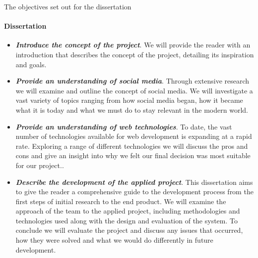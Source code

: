 The objectives set out for the dissertation 
\paragraph{Dissertation}
\begin{itemize}
\item \textit{\textbf{Introduce the concept of the project}}. We will provide the reader with an introduction that describes the concept of the project, detailing its inspiration and goals.
\item \textit{\textbf{Provide an understanding of social media}}. Through extensive research we will examine and outline the concept of social media. We will investigate a vast variety of topics ranging from how social media began, how it became what it is today and what we must do to stay relevant in the modern world.
\item \textit{\textbf{Provide an understanding of web technologies}}. To date, the vast number of technologies available for web development is expanding at a rapid rate. Exploring a range of different technologies we will discuss the pros and cons and give an insight into why we felt our final decision was most suitable for our project..
\item \textit{\textbf{Describe the development of the applied project}}. This dissertation aims to give the reader a comprehensive guide to the development process from the first steps of initial research to the end product. We will examine the approach of the team to the applied project, including methodologies and technologies used along with the design and evaluation of the system. To conclude we will evaluate the project and discuss any issues that occurred, how they were solved and what we would do differently in future development.
\end{itemize}
 
